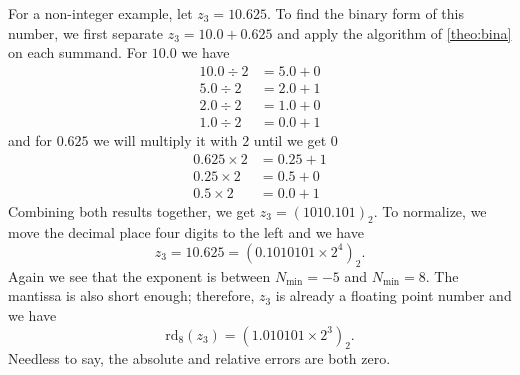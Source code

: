 \begin{exmp} \label{exmp:three}
    For a non-integer example, let \(z_3 = 10.625\). To find the binary form of this number, we first separate \(z_3 = 10.0 + 0.625\) and apply the algorithm of \ref{theo:bina} on each summand. For \(10.0\) we have
    \begin{align*}
        10.0 \div 2 &= 5.0 + 0 \\
        5.0 \div 2 &= 2.0 + 1 \\
        2.0 \div 2 &= 1.0 + 0 \\
        1.0 \div 2 &= 0.0 + 1
    \end{align*}
    and for \(0.625\) we will multiply it with \(2\) until we get \(0\)
    \begin{align*}
        0.625 \times 2 &= 0.25 + 1 \\
        0.25 \times 2 &= 0.5 + 0 \\
        0.5 \times 2 &= 0.0 + 1
    \end{align*}
    Combining both results together, we get \(z_3 = (1010.101)_2\). To normalize, we move the decimal place four digits to the left and we have
    \begin{equation*}
        z_3 = 10.625 = (0.1010101 \times 2^4)_2 \text{.}
    \end{equation*}
    Again we see that the exponent is between \(N_{\text{min}} = -5\) and \(N_{\text{min}} = 8\). The mantissa is also short enough; therefore, \(z_3\) is already a floating point number and we have
    \begin{equation*}
        \text{rd}_8(z_3) = (1.010101 \times 2^3)_2 \text{.}
    \end{equation*}
    Needless to say, the absolute and relative errors are both zero.
\end{exmp}
%
%

